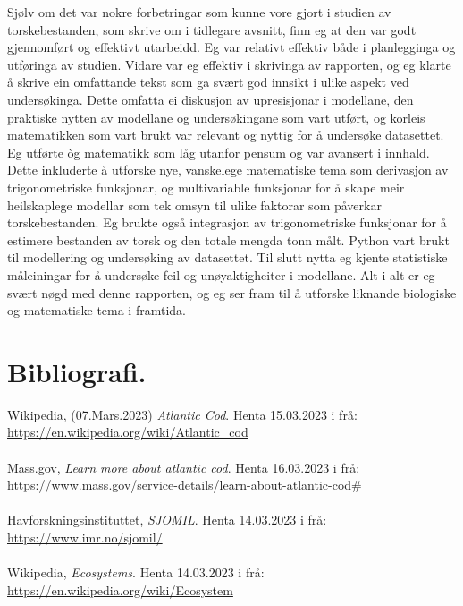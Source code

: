 \documentclass{report}
\begin{document}
Sjølv om det var nokre forbetringar som kunne vore gjort i studien av torskebestanden, som skrive om i tidlegare avsnitt, finn eg at den var godt gjennomført og effektivt utarbeidd. Eg var relativt effektiv både i planlegginga og utføringa av studien. Vidare var eg effektiv i skrivinga av rapporten, og eg klarte å skrive ein omfattande tekst som ga svært god innsikt i ulike aspekt ved undersøkinga. Dette omfatta ei diskusjon av upresisjonar i modellane, den praktiske nytten av modellane og undersøkingane som vart utført, og korleis matematikken som vart brukt var relevant og nyttig for å undersøke datasettet. Eg utførte òg matematikk som låg utanfor pensum og var avansert i innhald. Dette inkluderte å utforske nye, vanskelege matematiske tema som derivasjon av trigonometriske funksjonar, og multivariable funksjonar for å skape meir heilskaplege modellar som tek omsyn til ulike faktorar som påverkar torskebestanden. Eg brukte også integrasjon av trigonometriske funksjonar for å estimere bestanden av torsk og den totale mengda tonn målt. Python vart brukt til modellering og undersøking av datasettet. Til slutt nytta eg kjente statistiske måleiningar for å undersøke feil og unøyaktigheiter i modellane. Alt i alt er eg svært nøgd med denne rapporten, og eg ser fram til å utforske liknande biologiske og matematiske tema i framtida.
\chapter{Bibliografi.}
Wikipedia, (07.Mars.2023) \textit{Atlantic Cod}. Henta 15.03.2023 i frå: \\
\url{https://en.wikipedia.org/wiki/Atlantic_cod} \\ \\
Mass.gov, \textit{Learn more about atlantic cod}. Henta 16.03.2023 i frå: \\
\url{https://www.mass.gov/service-details/learn-about-atlantic-cod#} \\ \\
Havforskningsinstituttet, \textit{SJOMIL}. Henta 14.03.2023 i frå: \\
\url{https://www.imr.no/sjomil/} \\ \\
Wikipedia, \textit{Ecosystems}. Henta 14.03.2023 i frå: \\
\url{https://en.wikipedia.org/wiki/Ecosystem} \\ \\
\end{document}
